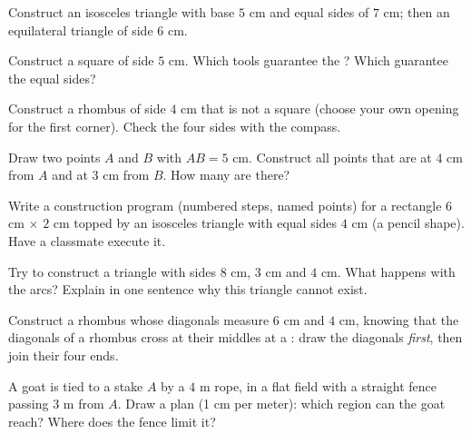 \begin{exercise}[$\star$]\label{exo:g5:geometry:4}
Construct an isosceles triangle with base $5$ cm and equal sides of
$7$ cm; then an equilateral triangle of side $6$ cm.
\end{exercise}

\begin{exercise}[$\star$]\label{exo:g5:geometry:5}
Construct a square of side $5$ cm. Which tools guarantee the ? Which guarantee the equal sides?
\end{exercise}

\begin{exercise}[$\star$]\label{exo:g5:geometry:6}
Construct a rhombus of side $4$ cm that is not a square (choose your
own opening for the first corner). Check the four sides with the
compass.
\end{exercise}

\begin{exercise}[$\star$]\label{exo:g5:geometry:7}
Draw two points $A$ and $B$ with $AB = 5$ cm. Construct all points
that are at $4$ cm from $A$ and at $3$ cm from $B$. How many are
there?
\end{exercise}

\begin{exercise}[$\star$]\label{exo:g5:geometry:8}
Write a construction program (numbered steps, named points) for a
rectangle $6$ cm $\times$ $2$ cm topped by an isosceles triangle
with equal sides $4$ cm (a pencil shape). Have a classmate execute
it.
\end{exercise}

\begin{exercise}[$\star\star$]\label{exo:g5:geometry:9}
Try to construct a triangle with sides $8$ cm, $3$ cm and $4$ cm.
What happens with the arcs? Explain in one sentence why this
triangle cannot exist.
\end{exercise}

\begin{exercise}[$\star\star$]\label{exo:g5:geometry:10}
Construct a rhombus whose diagonals measure $6$ cm and $4$ cm,
knowing that the diagonals of a rhombus cross at their middles at a
: draw the diagonals \emph{first}, then join their four
ends.
\end{exercise}

\begin{exercise}[$\star\star$]\label{exo:g5:geometry:11}
A goat is tied to a stake $A$ by a $4$ m rope, in a flat field with
a straight fence passing $3$ m from $A$. Draw a plan (1 cm per
meter): which region can the goat reach? Where does the fence limit
it?
\end{exercise}
